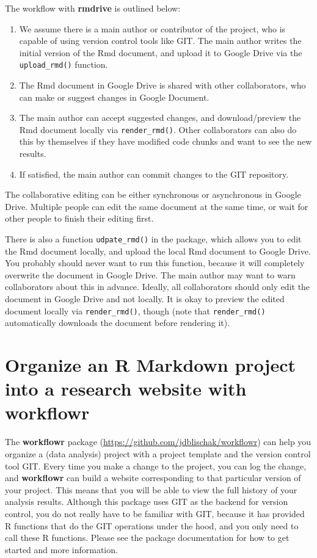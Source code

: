 \documentclass[
  11pt,
]{krantz}
\begin{document}
The workflow with \textbf{rmdrive} is outlined below:

\begin{enumerate}
\def\labelenumi{\arabic{enumi}.}
\item
  We assume there is a main author or contributor of the project, who is capable of using version control tools like GIT. The main author writes the initial version of the Rmd document, and upload it to Google Drive via the \texttt{upload\_rmd()} function.
\item
  The Rmd document in Google Drive is shared with other collaborators, who can make or suggest changes in Google Document.
\item
  The main author can accept suggested changes, and download/preview the Rmd document locally via \texttt{render\_rmd()}. Other collaborators can also do this by themselves if they have modified code chunks and want to see the new results.
\item
  If satisfied, the main author can commit changes to the GIT repository.
\end{enumerate}

The collaborative editing can be either synchronous or asynchronous in Google Drive. Multiple people can edit the same document at the same time, or wait for other people to finish their editing first.

There is also a function \texttt{udpate\_rmd()} in the package, which allows you to edit the Rmd document locally, and upload the local Rmd document to Google Drive. You probably should never want to run this function, because it will completely overwrite the document in Google Drive. The main author may want to warn collaborators about this in advance. Ideally, all collaborators should only edit the document in Google Drive and not locally. It is okay to preview the edited document locally via \texttt{render\_rmd()}, though (note that \texttt{render\_rmd()} automatically downloads the document before rendering it).

\hypertarget{workflowr}{%
\section{\texorpdfstring{Organize an R Markdown project into a research website with \textbf{workflowr}}{Organize an R Markdown project into a research website with workflowr}}\label{workflowr}}

The \textbf{workflowr} package \citep{R-workflowr} (\url{https://github.com/jdblischak/workflowr}) can help you organize a (data analysis) project with a project template and the version control tool GIT. Every time you make a change to the project, you can log the change, and \textbf{workflowr} can build a website corresponding to that particular version of your project. This means that you will be able to view the full history of your analysis results. Although this package uses GIT as the backend for version control, you do not really have to be familiar with GIT, because it has provided R functions that do the GIT operations under the hood, and you only need to call these R functions. Please see the package documentation for how to get started and more information.
\end{document}
